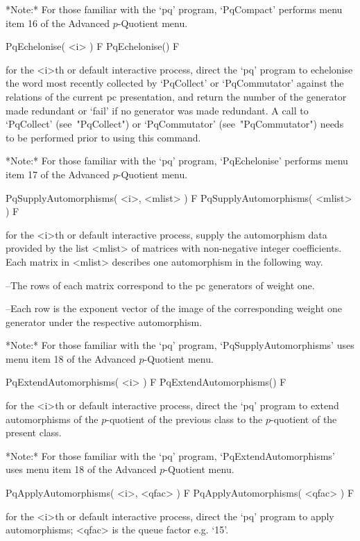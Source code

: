 *Note:*
For those familiar with the `pq' program, `PqCompact' performs  menu  item
16 of the Advanced $p$-Quotient menu.

\>PqEchelonise( <i> ) F
\>PqEchelonise() F

for the <i>th or default interactive {\ANUPQ} process,  direct  the  `pq'
program to echelonise the word most recently collected by `PqCollect'  or
`PqCommutator' against the relations of the current pc presentation,  and
return the number of  the  generator  made  redundant  or  `fail'  if  no
generator was made redundant. A call to `PqCollect' (see~"PqCollect")  or
`PqCommutator' (see~"PqCommutator") needs to be performed prior to  using
this command.

*Note:*
For those familiar with the `pq'  program,  `PqEchelonise'  performs  menu
item 17 of the Advanced $p$-Quotient menu.

\>PqSupplyAutomorphisms( <i>, <mlist> ) F
\>PqSupplyAutomorphisms( <mlist> ) F

for  the  <i>th  or  default  interactive {\ANUPQ}  process,  supply  the
automorphism  data  provided  by   the  list  <mlist>  of  matrices  with
non-negative integer coefficients.  Each  matrix in <mlist> describes one
automorphism in the following way.

\beginlist%
\item{--}The rows of each matrix  correspond  to  the  pc  generators  of
weight one.

\item{--}Each  row  is  the  exponent  vector  of  the   image   of   the
corresponding weight one generator under the respective automorphism.

\endlist

*Note:* 
For those familiar with the  `pq'  program,  `PqSupplyAutomorphisms'  uses
menu item 18 of the Advanced $p$-Quotient menu.

\>PqExtendAutomorphisms( <i> ) F
\>PqExtendAutomorphisms() F

for the <i>th or default interactive {\ANUPQ} process,  direct  the  `pq'
program to extend automorphisms of the $p$-quotient of the previous class
to the $p$-quotient of the present class.     

*Note:*
For those familiar with the  `pq'  program,  `PqExtendAutomorphisms'  uses
menu item 18 of the Advanced $p$-Quotient menu.

\>PqApplyAutomorphisms( <i>, <qfac> ) F
\>PqApplyAutomorphisms( <qfac> ) F

for the <i>th or default interactive {\ANUPQ} process,  direct  the  `pq'
program to apply automorphisms; <qfac> is the queue factor e.g. `15'.

